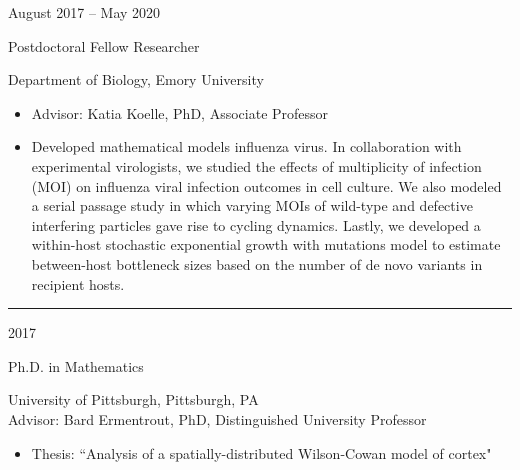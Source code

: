 \documentclass[a4paper,10pt]{article}
\newlength{\cvcolumngapwidth}
\newlength{\cvleftcolumnwidth}
\newlength{\cvrightcolumnwidth}
\newcommand{\cvsectionstyle}[1]{{\normalsize\cvsectionfont\textcolor{cvsectioncolor}{#1}}}
\newcommand{\cvtitlestyle}[1]{{\large\cvtitlefont\textcolor{cvtitlecolor}{#1}}}
\newcommand{\cvdurationstyle}[1]{{\small\cvdurationfont\textcolor{cvdurationcolor}{#1}}}
\newlength{\cvafteritemskipamount}
\newlength{\cvaftersectionskipamount}
\newlength{\cvbetweensectionandheadingextraskipamount}
\newlength{\cvaftertitleskipamount}
\newlength{\cvparskip}
\newcommand{\cvsection}[1]{
    \begin{minipage}[t]{\cvleftcolumnwidth}
        \raggedleft\cvsectionstyle{#1}
    \end{minipage}%
    \hspace{\cvcolumngapwidth}%
    \begin{minipage}[t]{\cvrightcolumnwidth}
        \textcolor{cvrulecolor}{\rule{\cvrightcolumnwidth}{0.3mm}}
    \end{minipage}

    \vspace{\cvaftersectionskipamount}
}
\newcommand{\cvitem}[2]{
    \begin{minipage}[t]{\cvleftcolumnwidth}
        \raggedleft #1
    \end{minipage}%
    \hspace{\cvcolumngapwidth}%
    \begin{minipage}[t]{\cvrightcolumnwidth}
        \setlength{\parskip}{\cvparskip} #2
    \end{minipage}

    \vspace{\cvafteritemskipamount}
}
\newcommand{\cvtitle}[1]{
    \cvtitlestyle{#1}

    \vspace{\cvaftertitleskipamount}
    \vspace{-\cvparskip}
}
\begin{document}
\cvitem{
    \cvdurationstyle{August 2017 -- May 2020}
}{
    \cvtitle{Postdoctoral Fellow Researcher}

	Department of Biology, Emory University %

    \begin{itemize}[leftmargin=*]
    	\item Advisor: Katia Koelle, PhD, Associate Professor
        \item Developed mathematical models influenza virus. In collaboration with experimental virologists, we studied the effects of multiplicity of infection (MOI) on influenza viral infection outcomes in cell culture. We also modeled a serial passage study in which varying MOIs of wild-type and defective interfering particles gave rise to cycling dynamics. Lastly, we developed a within-host stochastic exponential growth with mutations model to estimate between-host bottleneck sizes based on the number of de novo variants in recipient hosts.

    \end{itemize}
}

%
%



\cvsection{EDUCATION}
\vspace{\cvbetweensectionandheadingextraskipamount}

\cvitem{
    \cvdurationstyle{2017}
}{
    \cvtitle{Ph.D. in Mathematics}
	
	University of Pittsburgh, Pittsburgh, PA \\
    	Advisor: Bard Ermentrout, PhD, Distinguished University Professor

    \begin{itemize}[leftmargin=*]
        \item Thesis: ``Analysis of a spatially-distributed Wilson-Cowan model of cortex"
    \end{itemize}
}
\end{document}
